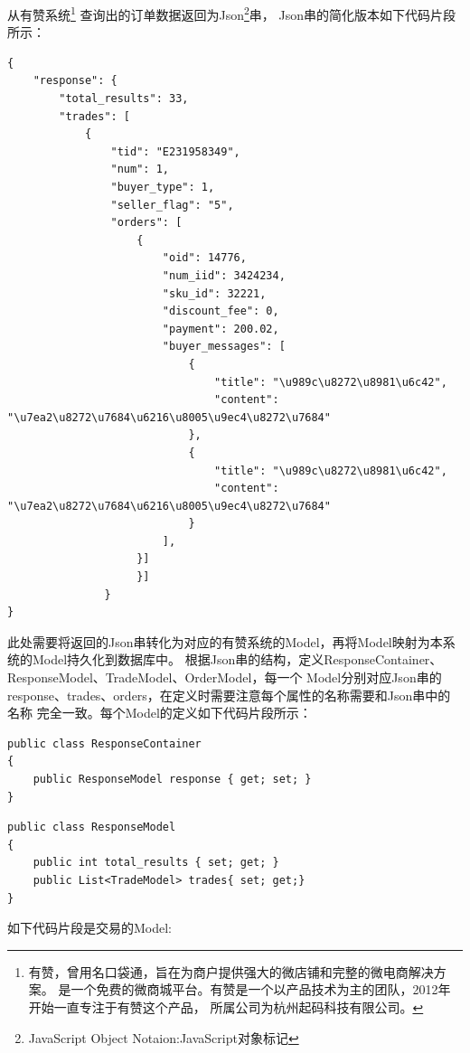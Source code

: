 \documentclass{book}
\begin{document}
从有赞系统\footnote{有赞，曾用名口袋通，旨在为商户提供强大的微店铺和完整的微电商解决方案。
是一个免费的微商城平台。有赞是一个以产品技术为主的团队，2012年开始一直专注于有赞这个产品，
所属公司为杭州起码科技有限公司。}
查询出的订单数据返回为Json\footnote{JavaScript Object Notaion:JavaScript对象标记}串，
Json串的简化版本如下代码片段所示：

\begin{lstlisting}
{
    "response": {
        "total_results": 33,
        "trades": [
            {
                "tid": "E231958349",
                "num": 1,                
                "buyer_type": 1,  
                "seller_flag": "5", 
                "orders": [
                    {
                        "oid": 14776,
                        "num_iid": 3424234,
                        "sku_id": 32221, 
                        "discount_fee": 0,
                        "payment": 200.02,
                        "buyer_messages": [
                            {
                                "title": "\u989c\u8272\u8981\u6c42",
                                "content": "\u7ea2\u8272\u7684\u6216\u8005\u9ec4\u8272\u7684"
                            },
                            {
                                "title": "\u989c\u8272\u8981\u6c42",
                                "content": "\u7ea2\u8272\u7684\u6216\u8005\u9ec4\u8272\u7684"
                            }
                        ],                       
                    }]
                    }]
               }
}
\end{lstlisting}

此处需要将返回的Json串转化为对应的有赞系统的Model，再将Model映射为本系统的Model持久化到数据库中。
根据Json串的结构，定义ResponseContainer、ResponseModel、TradeModel、OrderModel，每一个
Model分别对应Json串的response、trades、orders，在定义时需要注意每个属性的名称需要和Json串中的名称
完全一致。每个Model的定义如下代码片段所示：

\begin{lstlisting}[language={[Sharp]C}]
public class ResponseContainer
{
    public ResponseModel response { get; set; }        
}
\end{lstlisting}

\begin{lstlisting}[language={[Sharp]C}]
public class ResponseModel
{
    public int total_results { set; get; }
    public List<TradeModel> trades{ set; get;}        
}
\end{lstlisting}

如下代码片段是交易的Model:
\end{document}
